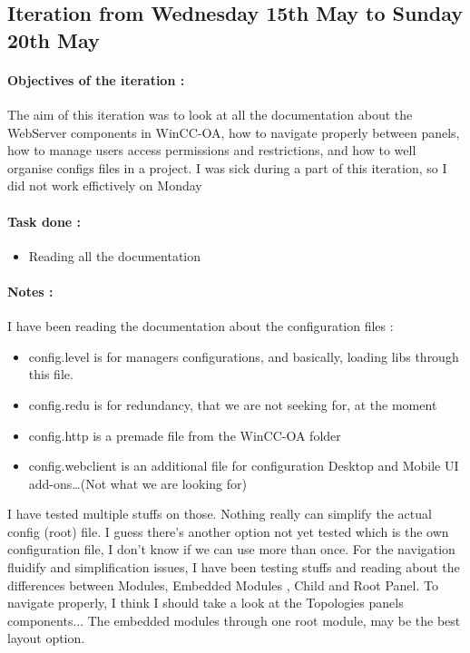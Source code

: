 \documentclass[a4paper, 12pt]{article}
\begin{document}
\begin{appendix}
    \subsection{Iteration from Wednesday 15th May to Sunday 20th May}
    \paragraph{Objectives of the iteration :}
    The aim of this iteration was to look at all the documentation about the WebServer components in WinCC-OA, how to navigate properly between panels, how to manage users access permissions and restrictions, and how to well organise configs files in a project. I was sick during a part of this iteration, so I did not work effictively on Monday
    \paragraph{Task done :}
    \begin{itemize}
        \item Reading all the documentation
    \end{itemize}

    \paragraph{Notes :} 
    I have been reading the documentation about the configuration files :
    \begin{itemize}
        \item config.level is for managers configurations, and basically, loading libs through this file.
        \item config.redu is for redundancy, that we are not seeking for, at the moment
        \item config.http is a premade file from the WinCC-OA folder
        \item config.webclient is an additional file for configuration Desktop and Mobile UI add-ons\dots (Not what we are looking for)
    \end{itemize}
    I have tested multiple stuffs on those. Nothing really can simplify the actual config (root) file.
    I guess there's another option not yet tested which is the own configuration file, I don't know if we can use more than once.\newline
    For the navigation fluidify and simplification issues, I have been testing stuffs and reading about the differences between Modules, Embedded Modules , Child and Root Panel.\newline
    To navigate properly, I think I should take a look at the Topologies panels components... The embedded modules through one root module, may be the best layout option.


\end{appendix}
\end{document}
